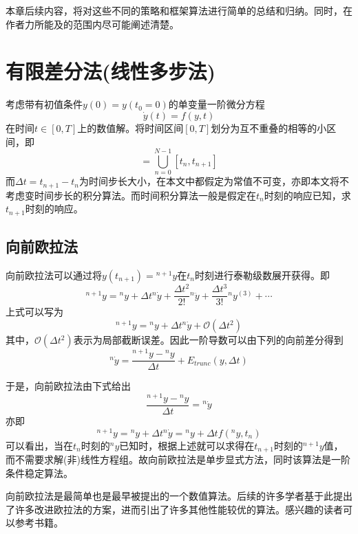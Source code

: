 本章后续内容，将对这些不同的策略和框架算法进行简单的总结和归纳。同时，在作者力所能及的范围内尽可能阐述清楚。
\section{有限差分法(线性多步法)}
考虑带有初值条件$y(0)=y(t_0=0)$的单变量一阶微分方程
\begin{equation}
\dot{y}(t)=f(y,t)\label{eq:firstSystem}
\end{equation}
在时间$t\in[0,T]$上的数值解。将时间区间$[0,T]$划分为互不重叠的相等的小区间，即
\begin{equation}
[0,T]=\bigcup_{n=0}^{N-1}[t_n,t_{n+1}]
\end{equation}
而$\Delta t=t_{n+1}-t_n$为时间步长大小，在本文中都假定为常值不可变，亦即本文将不考虑变时间步长的积分算法。而时间积分算法一般是假定在$t_n$时刻的响应已知，求$t_{n+1}$时刻的响应。
\subsection{向前欧拉法}
向前欧拉法可以通过将$y(t_{n+1})={^{n+1}\!y}$在$t_n$时刻进行泰勒级数展开获得。即
\begin{equation}
{^{n+1}\!y}={^{n}\!y}+\Delta t{^n\!\dot{y}}+\frac{\Delta t^2}{2!}{^n\!\ddot{y}}+\frac{\Delta t^3}{3!}{^n\!y^{(3)}}+\cdots
\end{equation}
上式可以写为
\begin{equation}
{^{n+1}\!y}={^{n}\!y}+\Delta t{^n\!\dot{y}}+\mathcal{O}(\Delta t^2)
\end{equation}
其中，$\mathcal{O}(\Delta t^2)$表示为局部截断误差。因此一阶导数可以由下列的向前差分得到
\begin{equation}
{^n\!\dot{y}}=\frac{{^{n+1}\!y}-{^n\!y}}{\Delta t}+E_{trunc}(y,\Delta t)
\end{equation}

于是，向前欧拉法由下式给出
\begin{equation}
\frac{{^{n+1}\!y}-{^n\!y}}{\Delta t}={^n\!\dot{y}}
\end{equation}
亦即
\begin{equation}
{^{n+1}\!y}={^n\!y}+\Delta t{^n\!\dot{y}}={^n\!y}+\Delta tf({^n\!y},t_n)
\end{equation}
可以看出，当在$t_n$时刻的${^n\!y}$已知时，根据上述就可以求得在$t_{n+1}$时刻的${^{n+1}\!y}$值，而不需要求解(非)线性方程组。故向前欧拉法是单步显式方法，同时该算法是一阶条件稳定算法。

向前欧拉法是最简单也是最早被提出的一个数值算法。后续的许多学者基于此提出了许多改进欧拉法的方案，进而引出了许多其他性能较优的算法。感兴趣的读者可以参考书籍。
